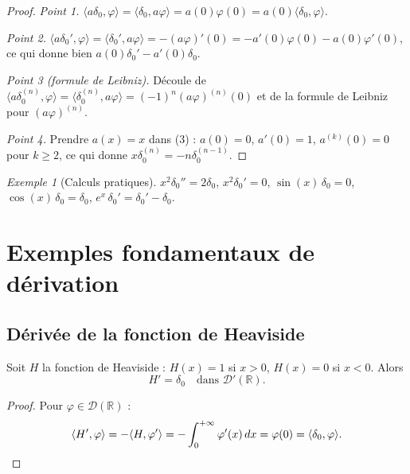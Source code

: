 \documentclass[12pt,a4paper,openany]{book}
\theoremstyle{definition}
\theoremstyle{plain}
\theoremstyle{remark}
\newtheorem*{example}{Exemple}
\newenvironment{exemple}{\begin{example}}{\end{example}}
\begin{document}
	\begin{proof}
		\emph{Point 1.} $\langle a\delta_0, \varphi\rangle = \langle \delta_0, a\varphi\rangle = a(0)\varphi(0) = a(0)\langle\delta_0,\varphi\rangle$.
		
		\emph{Point 2.} $\langle a\delta_0', \varphi\rangle = \langle \delta_0', a\varphi\rangle = -(a\varphi)'(0) = -a'(0)\varphi(0) - a(0)\varphi'(0)$, ce qui donne bien $a(0)\delta_0' - a'(0)\delta_0$.
		
		\emph{Point 3 (formule de Leibniz).} Découle de $\langle a\delta_0^{(n)}, \varphi\rangle = \langle\delta_0^{(n)}, a\varphi\rangle = (-1)^n(a\varphi)^{(n)}(0)$ et de la formule de Leibniz pour $(a\varphi)^{(n)}$.
		
		\emph{Point 4.} Prendre $a(x) = x$ dans (3) : $a(0) = 0$, $a'(0) = 1$, $a^{(k)}(0) = 0$ pour $k \geq 2$, ce qui donne $x\delta_0^{(n)} = -n\delta_0^{(n-1)}$.
	\end{proof}
	
	\begin{exemple}[Calculs pratiques]
		$x^2\delta_0'' = 2\delta_0$, \quad $x^2\delta_0' = 0$, \quad $\sin(x)\,\delta_0 = 0$, \quad $\cos(x)\,\delta_0 = \delta_0$, \quad $e^x\,\delta_0' = \delta_0' - \delta_0$.
	\end{exemple}
	
	\section{Exemples fondamentaux de dérivation}
	
	\subsection{Dérivée de la fonction de Heaviside}
	
	\begin{proposition}
		Soit $H$ la fonction de Heaviside : $H(x) = 1$ si $x > 0$, $H(x) = 0$ si $x < 0$. Alors
		\[
		H' = \delta_0 \quad \text{dans } \mathcal{D}'(\mathbb{R}).
		\]
	\end{proposition}
	
	\begin{proof}
		Pour $\varphi \in \mathcal{D}(\mathbb{R})$ :
		\[
		\langle H', \varphi \rangle = -\langle H, \varphi'\rangle = -\int_0^{+\infty}\varphi'(x)\,dx = \varphi(0) = \langle\delta_0,\varphi\rangle. \qedhere
		\]
	\end{proof}
	
\end{document}

